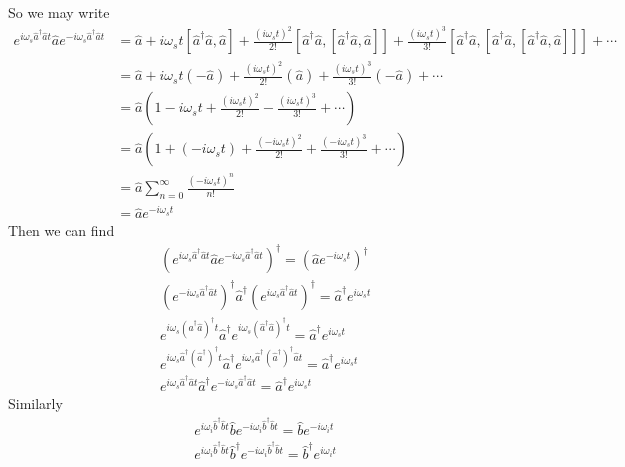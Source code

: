 \documentclass[aps,pra,showpacs,amsmath,amssymb,nofootinbib,longbibliography,superscriptaddress
]{revtex4-1}
\theoremstyle{definition}
\theoremstyle{remark}
\newcommand{\0}{\hat{0}}
\begin{document}
So we may write
\begin{align}
    e^{i\omega_s \hat{a}^{\dagger} \hat{a}t} \hat{a} e^{-i\omega_s \hat{a}^{\dagger} \hat{a}t}
    &= \hat{a} + i \omega_s t [\hat{a}^{\dagger} \hat{a}, \hat{a}] + \frac{(i \omega_s t)^2}{2!} [\hat{a}^{\dagger} \hat{a}, [\hat{a}^{\dagger} \hat{a}, \hat{a}]] + \frac{(i \omega_s t)^3}{3!}[\hat{a}^{\dagger} \hat{a}, [\hat{a}^{\dagger} \hat{a}, [\hat{a}^{\dagger} \hat{a}, \hat{a}]]] + \cdots \nonumber \\
    &= \hat{a} + i \omega_s t (-\hat{a}) + \frac{(i \omega_s t)^2}{2!} (\hat{a}) + \frac{(i \omega_s t)^3}{3!}(-\hat{a}) + \cdots \nonumber \\
    &= \hat{a}\left(1 - i \omega_s t + \frac{(i \omega_s t)^2}{2!} - \frac{(i \omega_s t)^3}{3!} + \cdots \right)\nonumber \\
    &= \hat{a}\left(1 + (-i \omega_s t) + \frac{(-i \omega_s t)^2}{2!} + \frac{(-i \omega_s t)^3}{3!} + \cdots \right)\nonumber \\
    &= \hat{a} \sum_{n=0}^{\infty} \frac{(-i \omega_s t)^n}{n!}\nonumber \\
    &= \hat{a} e^{-i \omega_s t}
\end{align}
Then we can find
\begin{align}
    &
    {(e^{i\omega_s \hat{a}^{\dagger} \hat{a}t} \hat{a} e^{-i\omega_s \hat{a}^{\dagger} \hat{a}t})}^{\dagger} =
    {(\hat{a} e^{-i \omega_s t})}^{\dagger} \nonumber \\
    &
    \left(e^{-i\omega_s \hat{a}^{\dagger} \hat{a}t}\right)^{\dagger} \hat{a}^{\dagger} \left(e^{i\omega_s \hat{a}^{\dagger} \hat{a}t}\right)^{\dagger} =
    \hat{a}^{\dagger} e^{i \omega_s t} \nonumber \\
    &
    e^{i\omega_s \left(\hat{a}^{\dagger} \hat{a}\right)^{\dagger}t} \hat{a}^{\dagger} e^{i\omega_s \left(\hat{a}^{\dagger} \hat{a}\right)^{\dagger}t} =
    \hat{a}^{\dagger} e^{i \omega_s t} \nonumber \\
    &
    e^{i\omega_s \hat{a}^{\dagger} \left(\hat{a}^{\dagger} \right)^{\dagger} t} \hat{a}^{\dagger} e^{i\omega_s \hat{a}^{\dagger} \left(\hat{a}^{\dagger} \right)^{\dagger} \hat{a} t} =
    \hat{a}^{\dagger} e^{i \omega_s t} \nonumber \\
    &
    e^{i\omega_s \hat{a}^{\dagger} \hat{a}t} \hat{a}^{\dagger} e^{-i\omega_s \hat{a}^{\dagger} \hat{a}t} =
    \hat{a}^{\dagger} e^{i \omega_s t}
\end{align}
Similarly
\begin{align}
    &e^{i\omega_i \hat{b}^{\dagger} \hat{b}t} \hat{b} e^{-i\omega_i \hat{b}^{\dagger} \hat{b}t} = \hat{b} e^{-i \omega_i t}\\
    &e^{i\omega_i \hat{b}^{\dagger} \hat{b}t} \hat{b}^{\dagger} e^{-i\omega_i \hat{b}^{\dagger} \hat{b}t} = \hat{b}^{\dagger} e^{i \omega_i t}
\end{align}
\end{document}
